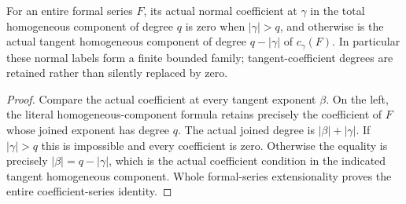 \begin{theorem}
\label{hir:actual-mixed-homogeneous-coefficient-bands}
\leanok
For an entire formal series $F$, its actual normal coefficient at $\gamma$
in the total homogeneous component of degree $q$ is zero when $|\gamma|>q$,
and otherwise is the actual tangent homogeneous component of degree
$q-|\gamma|$ of $c_\gamma(F)$. In particular these normal labels form a
finite bounded family; tangent-coefficient degrees are retained rather than
silently replaced by zero.
\end{theorem}
\begin{proof}
Compare the actual coefficient at every tangent exponent $\beta$.
On the left, the literal homogeneous-component formula retains precisely the
coefficient of $F$ whose joined exponent has degree $q$.
The actual joined degree is $|\beta|+|\gamma|$. If $|\gamma|>q$ this is
impossible and every coefficient is zero. Otherwise the equality is precisely
$|\beta|=q-|\gamma|$, which is the actual coefficient condition in the
indicated tangent homogeneous component. Whole formal-series extensionality
proves the entire coefficient-series identity.
\end{proof}

